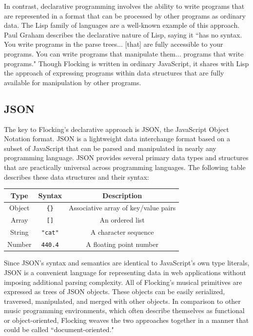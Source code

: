 \documentclass{article}
\begin{document}
In contrast, declarative programming involves the ability to write programs that are represented in a format that can be processed by other programs as ordinary data. The Lisp family of languages are a well-known example of this approach. Paul Graham describes the declarative nature of Lisp, saying it ``has no syntax. You write programs in the parse trees... [that] are fully accessible to your programs. You can write programs that manipulate them... programs that write programs." Though Flocking is written in ordinary JavaScript, it shares with Lisp the approach of expressing programs within data structures that are fully available for manipulation by other programs.

\subsection{JSON}

The key to Flocking's declarative approach is JSON, the JavaScript Object Notation format. JSON is a lightweight data interchange format based on a subset of JavaScript that can be parsed and manipulated in nearly any programming language. JSON provides several primary data types and structures that are practically universal across programming languages. The following table describes these data structures and their syntax:

\begin{tabular}{| c || c | c |}
    \hline
    \bf{Type} & \bf{Syntax} & \bf{Description} \\ \hline
    Object & \verb|{}| & Associative array of key/value pairs \\ \hline
    Array & \verb|[]| & An ordered list \\ \hline
    String & \verb|"cat"| & A character sequence \\ \hline
    Number & \verb|440.4| & A floating point number \\ \hline
\end{tabular}

Since JSON's syntax and semantics are identical to JavaScript's own type literals, JSON is a convenient language for representing data in web applications without imposing additional parsing complexity. All of Flocking's musical primitives are expressed as trees of JSON objects. These objects can be easily serialized, traversed, manipulated, and merged with other objects. In comparison to other music programming environments, which often describe themselves as functional or object-oriented, Flocking weaves the two approaches together in a manner that could be called ``document-oriented."
\end{document}
